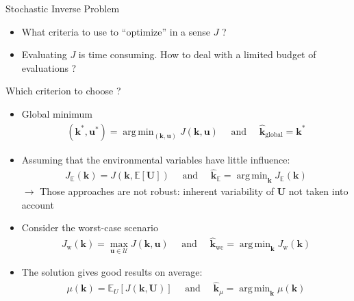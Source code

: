 \documentclass{beamer}
\newlength{\sndcolwid}
\newcommand{\Ex}{\mathbb{E}}
\newcommand{\Var}{\mathbb{V}\mathrm{ar}}
\DeclareMathOperator*{\argmin}{arg\,min}
\newcommand{\kest}{\hat{\bm{k}}}
\begin{document}
\begin{frame}[t]
\begin{columns}[t]
\begin{column}{\sndcolwid}
\begin{block}{Stochastic Inverse Problem}
\begin{itemize}
\item What criteria to use to ``optimize'' in a sense $J$ ?
\item Evaluating $J$ is time consuming. How to deal with a limited budget of evaluations ?
\end{itemize}
\end{block}
\begin{block}{Which criterion to choose ? \nocite{lehman_designing_2004}}
  \begin{itemize}
  \item Global minimum
    \begin{align*}
      (\bm{k}^*,\bm{u}^*) = \argmin_{(\bm{k},\bm{u})} J(\bm{k},\bm{u})\quad \text{ and } \quad  \kest_{\mathrm{global}} = \bm{k}^*
    \end{align*}
  \item Assuming that the environmental variables have little influence:
    \begin{align*}
    J_{\Ex}(\bm{k}) = J(\bm{k}, \Ex[\bm U]) \quad \text{ and } \quad \kest_{\Ex} = \argmin_{\bm{k}} J_{\Ex}(\bm{k}) \tag{Classical methods}
    \end{align*}
$\longrightarrow$ Those approaches are not robust: inherent variability of $\bm{U}$ not taken into account \\[1.3ex]
  \item Consider the \alert{worst-case scenario} \nocite{wald_statistical_1945}
    \begin{align*}
      J_{\mathrm{w}}(\bm{k}) = \max_{\bm{u}\in\mathcal{U}} J(\bm{k},\bm{u}) \quad \text{ and } \quad \kest_{\mathrm{wc}} = \argmin_{\bm{k}} J_{\mathrm{w}}(\bm{k})      \tag{Explorative EGO}
    \end{align*}
    \item The solution gives \alert{good results on average}:
  \begin{align*}
    \mu(\bm{k}) = \Ex_U[J(\bm{k},\bm{U})]\quad \text{ and }  \quad  \kest_{\mu} = \argmin_{\bm{k}}  \mu(\bm{k}) \tag{Iterative EGO}
  \end{align*}


\end{itemize}
\end{block}
\end{column}
\end{columns}
\end{frame}
\end{document}

